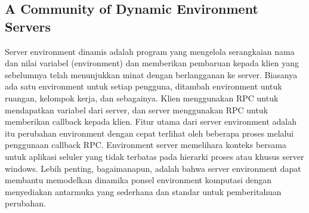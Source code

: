 \subsection {A Community of Dynamic Environment Servers}

Server environment dinamis adalah program yang mengelola serangkaian nama dan nilai variabel (environment) dan memberikan pembaruan kepada klien yang sebelumnya telah menunjukkan minat dengan berlangganan ke server. Biasanya ada satu environment untuk setiap pengguna, ditambah environment untuk ruangan, kelompok kerja, dan sebagainya. Klien menggunakan RPC untuk mendapatkan variabel dari server, dan server menggunakan RPC untuk memberikan callback kepada klien. Fitur utama dari server environment adalah itu perubahan environment dengan cepat terlihat oleh beberapa proses melalui penggunaan callback RPC. Environment server memelihara konteks bersama untuk aplikasi seluler yang tidak terbatas pada hierarki proses atau khusus server windows. Lebih penting, bagaimanapun, adalah bahwa server environment dapat membantu memodelkan dinamika ponsel environment komputasi dengan menyediakan antarmuka yang sederhana dan standar untuk pemberitahuan perubahan. \cite{schilit1993customizing}









